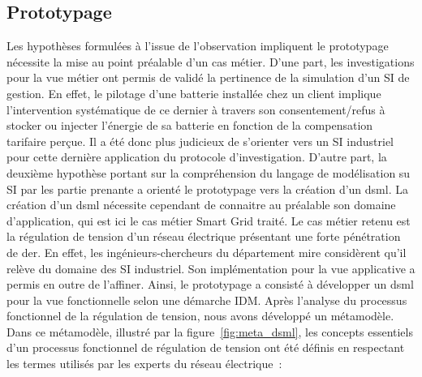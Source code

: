 			\subsection{Prototypage}
		Les hypothèses formulées à l'issue de l'observation impliquent le prototypage nécessite la mise au point préalable d'un cas métier. D'une part, les investigations pour la vue métier ont permis de validé la pertinence de la simulation d'un SI de gestion. En effet, le pilotage d'une batterie installée chez un client implique l'intervention systématique de ce dernier à travers son consentement/refus à stocker ou injecter l'énergie de sa batterie en fonction de la compensation tarifaire perçue. Il a été donc plus judicieux de s'orienter vers un SI industriel pour cette dernière application du protocole  d'investigation. D'autre part, la deuxième hypothèse portant sur la compréhension du langage de modélisation su SI par les partie prenante a orienté le prototypage vers la création d'un \gls{dsml}. La création d'un \gls{dsml} nécessite cependant de connaitre au préalable son domaine d'application, qui est ici le cas métier Smart Grid traité. 
		Le cas métier retenu est la régulation de tension d'un réseau électrique présentant une forte pénétration de \gls{der}. En effet, les ingénieurs-chercheurs du département \gls{mire} considèrent qu'il relève du domaine des SI industriel. Son implémentation pour la vue applicative a permis en outre de l'affiner. 
		Ainsi, le prototypage a consisté à développer un \gls{dsml} pour la vue fonctionnelle selon une démarche IDM. Après l'analyse du processus fonctionnel de la régulation de tension, nous avons développé un métamodèle. Dans ce métamodèle, illustré par la figure~\ref{fig:meta_dsml}, les concepts essentiels d'un processus fonctionnel de régulation de tension ont été définis en respectant les termes utilisés par les experts du réseau électrique~:
		
